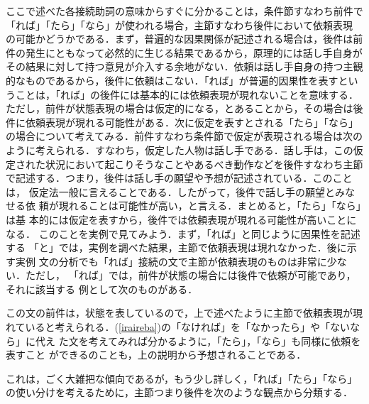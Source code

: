 ここで述べた各接続助詞の意味からすぐに分かることは，条件節すなわち前件で
「れば」「たら」「なら」が使われる場合，主節すなわち後件において依頼表現
の可能かどうかである．まず，普遍的な因果関係が記述される場合は，後件は前
件の発生にともなって必然的に生じる結果であるから，原理的には話し手自身が
その結果に対して持つ意見が介入する余地がない．依頼は話し手自身の持つ主観
的なものであるから，後件に依頼はこない．「れば」が普遍的因果性を表すとい
うことは，「れば」の後件には基本的には依頼表現が現れないことを意味する．
ただし，前件が状態表現の場合は仮定的になる，とあることから，その場合は後
件に依頼表現が現れる可能性がある．次に仮定を表すとされる「たら」「なら」
の場合について考えてみる．前件すなわち条件節で仮定が表現される場合は次の
ように考えられる．すなわち，仮定した人物は話し手である．話し手は，この仮
定された状況において起こりそうなことやあるべき動作などを後件すなわち主節
で記述する．つまり，後件は話し手の願望や予想が記述されている．このことは，
仮定法一般に言えることである．したがって，後件で話し手の願望とみなせる依
頼が現れることは可能性が高い，と言える．まとめると，「たら」「なら」は基
本的には仮定を表すから，後件では依頼表現が現れる可能性が高いことになる．
このことを実例で見てみよう．まず，「れば」と同じように因果性を記述する
「と」では，実例を調べた結果，主節で依頼表現は現れなかった．後に示す実例
文の分析でも「れば」接続の文で主節が依頼表現のものは非常に少ない．ただし，
「れば」では，前件が状態の場合には後件で依頼が可能であり，それに該当する
例として次のものがある．

この文の前件は，状態を表しているので，上で述べたように主節で依頼表現が現れていると考えられる．(\ref{iraireba})の「なければ」を「なかったら」や「ないなら」に代え
た文を考えてみれば分かるように，「たら」，「なら」も同様に依頼を表すこと
ができるのことも，上の説明から予想されることである．

これは，ごく大雑把な傾向であるが，もう少し詳しく，「れば」「たら」「なら」
の使い分けを考えるために，主節つまり後件を次のような観点から分類する．


